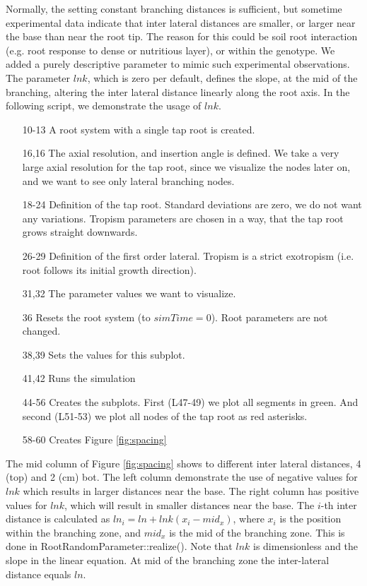 Normally, the setting constant branching distances is sufficient, but sometime experimental data indicate that inter lateral distances are smaller, or larger near the base than near the root tip. The reason for this could be soil root interaction (e.g. root response to dense or nutritious layer), or within the genotype. We added a purely descriptive parameter to mimic such experimental observations. The parameter $lnk$, which is zero per default, defines the slope, at the mid of the branching, altering the inter lateral distance linearly along the root axis. In the following script, we demonstrate the usage of $lnk$.



\begin{itemize}
\item[10-13] A root system with a single tap root is created. 
\item[16,16] The axial resolution, and insertion angle is defined. We take a very large axial resolution for the tap root, since we visualize the nodes later on, and we want to see only lateral branching nodes.
\item[18-24] Definition of the tap root. Standard deviations are zero, we do not want any variations. Tropism parameters are chosen in a way, that the tap root grows straight downwards.
\item[26-29] Definition of the first order lateral. Tropism is a strict exotropism (i.e. root follows its initial growth direction).
\item[31,32] The parameter values we want to visualize.
\item[36] Resets the root system (to $simTime = 0$). Root parameters are not changed. 
\item[38,39] Sets the values for this subplot. 
\item[41,42] Runs the simulation
\item[44-56] Creates the subplots. First (L47-49) we plot all segments in green. And second (L51-53) we plot all nodes of the tap root as red asterisks.
\item[58-60] Creates Figure \ref{fig:spacing}
\end{itemize}

The mid column of Figure \ref{fig:spacing} shows to different inter lateral distances, 4 (top) and 2 (cm) bot. The left column demonstrate the use of negative values for $lnk$ which results in larger distances near the base. The right column has positive values for $lnk$, which will result in smaller distances near the base. The $i$-th inter distance is calculated as $ln_i = ln + lnk (x_i-mid_x)$, where $x_i$ is the position within the branching zone, and $mid_x$ is the mid of the branching zone. This is done in RootRandomParameter::realize(). Note that $lnk$ is dimensionless and the slope in the linear equation. At mid of the branching zone the inter-lateral distance equals $ln$. 

